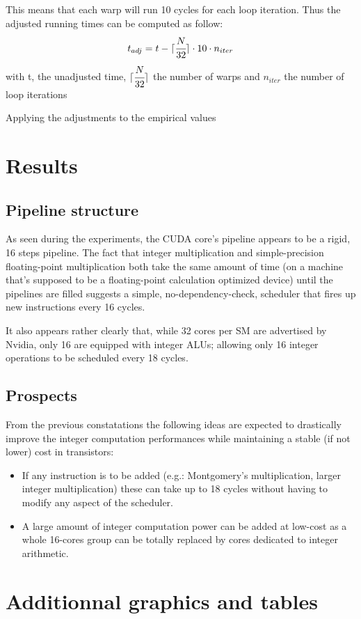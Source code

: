 \documentclass{article}
\DeclarePairedDelimiter\ceil{\lceil}{\rceil}
\begin{document}
	This means that each warp will run 10 cycles for each loop iteration. Thus the 
    adjusted running times can be computed as follow:
    \[ t_{adj} = t - \ceil{\cfrac{N}{32}}\cdot 10 \cdot n_{iter} \]
    with t, the unadjusted time, $\ceil{\cfrac{N}{32}}$ the number of warps and 
    $n_{iter}$ the number of loop iterations

    Applying the adjustments to the empirical values %

\section{Results}
    \subsection{Pipeline structure}
    As seen during the experiments, the CUDA core's pipeline appears to be a
    rigid, 16 steps pipeline. The fact that integer multiplication and 
    simple-precision floating-point multiplication both take the same amount
    of time (on a machine that's supposed to be a floating-point calculation
    optimized device) until the pipelines are filled suggests a simple,
    no-dependency-check, scheduler that fires up new instructions every 16 cycles.

    It also appears rather clearly that, while 32 cores per SM are advertised by
    Nvidia, only 16 are equipped with integer ALUs; allowing only 16 integer
    operations to be scheduled every 18 cycles.
    
    \subsection{Prospects}
    From the previous constatations the following ideas are expected to drastically
    improve the integer computation performances while maintaining a stable (if not
    lower) cost in transistors:
    \begin{itemize}
        \item If any instruction is to be added (e.g.: Montgomery's multiplication, larger integer multiplication) these can take up to 18 cycles without having to modify any aspect of the scheduler.
        \item A large amount of integer computation power can be added at low-cost as a whole 16-cores group can be totally replaced by cores dedicated to integer arithmetic.
    \end{itemize}
\section{Additionnal graphics and tables}
\end{document}

